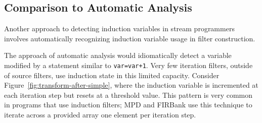 \subsection{Comparison to Automatic Analysis}

Another approach to detecting induction variables in 
stream programmers involves automatically
recognizing induction variable usage in filter construction. 

The approach of automatic analysis would idiomatically detect 
a variable modified by a statement similar to \texttt{var=var+1}. 
Very few iteration filters, outside of source filters, use induction state 
in this limited capacity. Consider Figure~\ref{fig:transform-after-simple}, where
the induction variable is incremented at each iteration step but resets at 
a threshold value. This pattern is very common in programs that use
induction filters; MPD and FIRBank use this technique to iterate
across a provided array one element per iteration step. 







